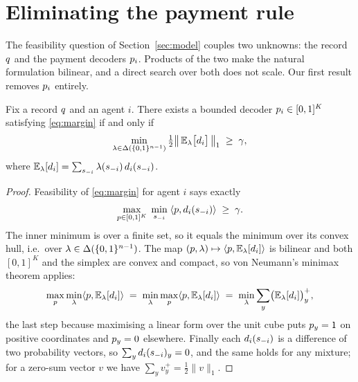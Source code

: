 \section{Eliminating the payment rule}
\label{sec:elimination}

The feasibility question of Section~\ref{sec:model} couples two unknowns: the
record $q$ and the payment decoders $p_i$. Products of the two make the
natural formulation bilinear, and a direct search over both does not scale. Our
first result removes $p_i$ entirely.

\begin{theorem}
\label{thm:elim}
Fix a record $q$ and an agent $i$. There exists a bounded decoder
$p_i \in [0,1]^K$ satisfying \eqref{eq:margin} if and only if
\[
  \min_{\lambda \in \Delta(\{0,1\}^{n-1})}
  \tfrac{1}{2}\bigl\|\,\mathbb{E}_{\lambda}\bigl[d_i\bigr]\,\bigr\|_1 \;\ge\; \gamma ,
\]
where $\mathbb{E}_\lambda[d_i] = \sum_{s_{-i}} \lambda(s_{-i})\, d_i(s_{-i})$.
\end{theorem}

\begin{proof}
Feasibility of \eqref{eq:margin} for agent $i$ says exactly
\[
  \max_{p \in [0,1]^K} \; \min_{s_{-i}} \; \langle p, d_i(s_{-i})\rangle
  \;\ge\; \gamma .
\]
The inner minimum is over a finite set, so it equals the minimum over its convex
hull, i.e.\ over $\lambda \in \Delta(\{0,1\}^{n-1})$. The map
$(p,\lambda) \mapsto \langle p, \mathbb{E}_\lambda[d_i]\rangle$ is bilinear and both
$[0,1]^K$ and the simplex are convex and compact, so von Neumann's minimax
theorem applies:
\[
  \max_{p} \min_{\lambda} \langle p, \mathbb{E}_\lambda[d_i]\rangle
  \;=\; \min_{\lambda} \max_{p} \langle p, \mathbb{E}_\lambda[d_i]\rangle
  \;=\; \min_{\lambda} \sum_y \bigl(\mathbb{E}_\lambda[d_i]\bigr)_y^{+},
\]
the last step because maximising a linear form over the unit cube puts
$p_y = 1$ on positive coordinates and $p_y = 0$ elsewhere. Finally each
$d_i(s_{-i})$ is a difference of two probability vectors, so
$\sum_y d_i(s_{-i})_y = 0$, and the same holds for any mixture; for a
zero-sum vector $v$ we have $\sum_y v_y^+ = \tfrac12\|v\|_1$.
\end{proof}

